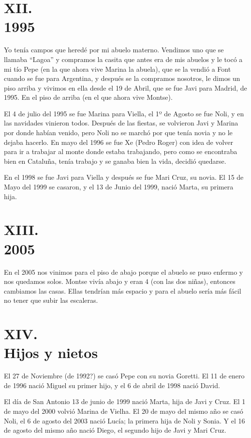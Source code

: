 \documentclass[12pt,a5paper]{book}
\begin{document}
\section*{XII.\\1995}

Yo tenía campos que heredé por mi abuelo materno. Vendimos uno que se llamaba “Lagoa” y compramos la casita que antes era de mis abuelos y le tocó a mi tío Pepe (en la que ahora vive Marina la abuela), que se la vendió a Font cuando se fue para Argentina, y después se la compramos nosotros, le dimos un piso arriba y vivimos en ella desde el 19 de Abril, que se fue Javi para Madrid, de 1995. En el piso de arriba (en el que ahora vive Montse).

El 4 de julio del 1995 se fue Marina para Viella, el 1º de Agosto se fue Noli, y en las navidades vinieron todos. Después de las fiestas, se volvieron Javi y Marina por donde habían venido, pero Noli no se marchó por que tenía novia y no le dejaba hacerlo. En mayo del 1996 se fue Xe (Pedro Roger) con idea de volver para ir a trabajar al monte donde estaba trabajando, pero como se encontraba bien en Cataluña, tenía trabajo y se ganaba bien la vida, decidió quedarse.

En el 1998 se fue Javi para Viella y después se fue Mari Cruz, su novia. El 15 de Mayo del 1999 se casaron, y el 13 de Junio del 1999, nació Marta, su primera hija.


\section*{XIII.\\2005}

En el 2005 nos vinimos para el piso de abajo porque el abuelo se puso enfermo y nos quedamos solos. Montse vivía abajo y eran 4 (con las dos niñas), entonces cambiamos las casas. Ellas tendrían más espacio y para el abuelo sería más fácil no tener que subir las escaleras.


\section*{XIV.\\Hijos y nietos}

El 27 de Noviembre (de 1992?) se casó Pepe con su novia Goretti. El 11 de enero de 1996 nació Miguel su primer hijo, y el 6 de abril de 1998 nació David.

El día de San Antonio 13 de junio de 1999 nació Marta, hija de Javi y Cruz. El 1 de mayo del 2000 volvió Marina de Vielha. El 20 de mayo del mismo año se casó Noli, el 6 de agosto del 2003 nació Lucía; la primera hija de Noli y Sonia. Y el 16 de agosto del mismo año nació Diego, el segundo hijo de Javi y Mari Cruz.
\end{document}
